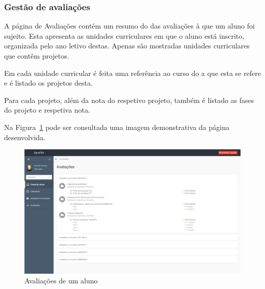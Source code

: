 \subsubsection{Gestão de avaliações}

A página de Avaliações contém um resumo do das avaliações à que um aluno foi sujeito. Esta apresenta as unidades curriculares em que o aluno está inscrito, organizada pelo ano letivo destas. Apenas são mostradas unidades curriculares que contêm projetos.

Em cada unidade curricular é feita uma referência ao curso do a que esta se refere e é listado os projetos desta.

Para cada projeto, além da nota do respetivo projeto, também é listado as fases do projeto e respetiva nota.

Na Figura~\ref{fig:student_grades} pode ser consultada uma imagem demonstrativa da página desenvolvida.

\begin{figure}[H]
  \centering
  \includegraphics[width=1\textwidth,center]{images/implementacao/alunos/grades}
  \caption{Avaliações de um aluno}
  \label{fig:student_grades}
\end{figure}
